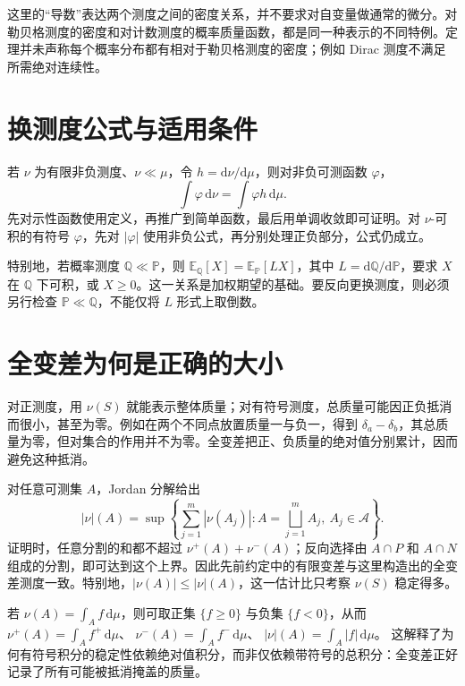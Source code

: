 这里的“导数”表达两个测度之间的密度关系，并不要求对自变量做通常的微分。对勒贝格测度的密度和对计数测度的概率质量函数，都是同一种表示的不同特例。定理并未声称每个概率分布都有相对于勒贝格测度的密度；例如 Dirac 测度不满足所需绝对连续性。

\section{换测度公式与适用条件}
若 $\nu$ 为有限非负测度、$\nu\ll\mu$，令 $h=\mathrm d\nu/\mathrm d\mu$，则对非负可测函数 $\varphi$，
\begin{equation}
 \int\varphi\,\mathrm d\nu=\int\varphi h\,\mathrm d\mu.
 \label{eq:mt-change-measure}
\end{equation}
先对示性函数使用定义，再推广到简单函数，最后用单调收敛即可证明。对 $\nu$-可积的有符号 $\varphi$，先对 $|\varphi|$ 使用非负公式，再分别处理正负部分，公式仍成立。

特别地，若概率测度 $\mathbb Q\ll\mathbb P$，则
$\mathbb E_{\mathbb Q}[X]=\mathbb E_{\mathbb P}[LX]$，其中
$L=\mathrm d\mathbb Q/\mathrm d\mathbb P$，要求 $X$ 在 $\mathbb Q$ 下可积，或 $X\geq0$。这一关系是加权期望的基础。要反向更换测度，则必须另行检查 $\mathbb P\ll\mathbb Q$，不能仅将 $L$ 形式上取倒数。

\section{全变差为何是正确的大小}
对正测度，用 $\nu(S)$ 就能表示整体质量；对有符号测度，总质量可能因正负抵消而很小，甚至为零。例如在两个不同点放置质量一与负一，得到 $\delta_a-\delta_b$，其总质量为零，但对集合的作用并不为零。全变差把正、负质量的绝对值分别累计，因而避免这种抵消。

对任意可测集 $A$，Jordan 分解给出
\[
 |\nu|(A)=\sup\left\{\sum_{j=1}^{m}|\nu(A_j)|:
 A=\bigsqcup_{j=1}^{m}A_j,\ A_j\in\mathcal A\right\}.
\]
证明时，任意分割的和都不超过 $\nu^+(A)+\nu^-(A)$；反向选择由 $A\cap P$ 和 $A\cap N$ 组成的分割，即可达到这个上界。因此先前约定中的有限变差与这里构造出的全变差测度一致。特别地，$|\nu(A)|\leq|\nu|(A)$，这一估计比只考察 $\nu(S)$ 稳定得多。

若 $\nu(A)=\int_Af\,\mathrm d\mu$，则可取正集 $\{f\geq0\}$ 与负集 $\{f<0\}$，从而
$\nu^+(A)=\int_Af^+\,\mathrm d\mu$、
$\nu^-(A)=\int_Af^-\,\mathrm d\mu$、
$|\nu|(A)=\int_A|f|\,\mathrm d\mu$。
这解释了为何有符号积分的稳定性依赖绝对值积分，而非仅依赖带符号的总积分：全变差正好记录了所有可能被抵消掩盖的质量。

